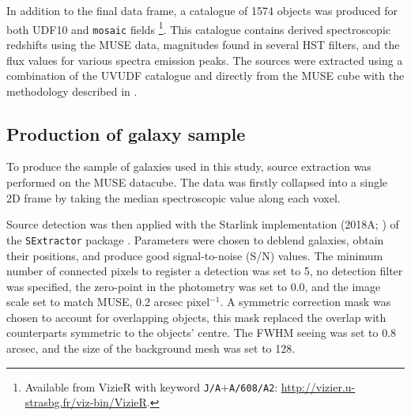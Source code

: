 \documentclass[12pt, twocolumn, nofootinbib]{revtex4-1}    %
\def\Plus{\texttt{+}}
\begin{document}
In addition to the final data frame, a catalogue of 1574 objects was produced for both UDF10 and \texttt{mosaic} fields \citep{2017A&A...608A...2I}\footnote{Available from VizieR with keyword \texttt{J/A$\Plus$A/608/A2}: \href{http://vizier.u-strasbg.fr/viz-bin/VizieR}{http://vizier.u-strasbg.fr/viz-bin/VizieR}.}. This catalogue contains derived spectroscopic redshifts using the MUSE data, magnitudes found in several HST filters, and the flux values for various spectra emission peaks. The sources were extracted using a combination of the UVUDF catalogue \citep{2015AJ....150...31R} and directly from the MUSE cube with the methodology described in \cite{2017A&A...608A...1B, 2017A&A...608A...2I}.  

\vspace{2ex} %
\subsection{Production of galaxy sample}
\noindent
To produce the sample of galaxies used in this study, source extraction was performed on the MUSE datacube. The data was firstly collapsed into a single 2D frame by taking the median spectroscopic value along each voxel.

Source detection was then applied with the Starlink implementation (2018A; \citealt{2014ASPC..485..391C}) of the \texttt{SExtractor} package \citep{1996A&AS..117..393B}. Parameters were chosen to deblend galaxies, obtain their positions, and produce good signal-to-noise (S/N) values. The minimum number of connected pixels to register a detection was set to 5, no detection filter was specified, the zero-point in the photometry was set to 0.0, and the image scale set to match MUSE, 0.2 arcsec pixel$^{-1}$. A symmetric correction mask was chosen to account for overlapping objects, this mask replaced the overlap with counterparts symmetric to the objects’ centre. The FWHM seeing was set to 0.8 arcsec, and the size of the background mesh was set to 128. 
\end{document}
